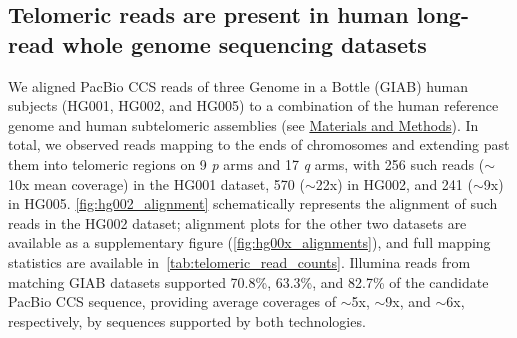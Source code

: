 \documentclass{article}
\begin{document}
\subsection*{Telomeric reads are present in human long-read whole genome sequencing datasets}
We aligned PacBio CCS reads of three Genome in a Bottle (GIAB) human subjects (HG001, HG002, and HG005) to a combination of the human reference genome and human subtelomeric assemblies (see \hyperref[sec:methods]{Materials and Methods}).
In total, we observed reads mapping to the ends of chromosomes and extending past them into telomeric regions on 9 \textit{p} arms and 17 \textit{q} arms, with 256 such reads ($\sim$10x mean coverage) in the HG001 dataset, 570 ($\sim$22x) in HG002, and 241 ($\sim$9x) in HG005.
\autoref{fig:hg002_alignment} schematically represents the alignment of such reads in the HG002 dataset; alignment plots for the other two datasets are available as a supplementary figure (\autoref{fig:hg00x_alignments}), and full mapping statistics are available \mbox{in \autoref{tab:telomeric_read_counts}}.
Illumina reads from matching GIAB datasets supported 70.8\%, 63.3\%, and 82.7\% of the candidate PacBio CCS sequence, %
providing average coverages of $\sim$5x, $\sim$9x, and $\sim$6x, respectively, by sequences supported by both technologies.
\end{document}
